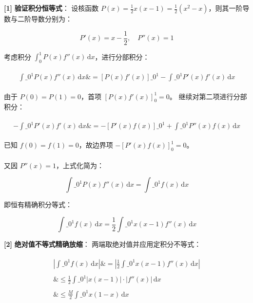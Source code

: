 \documentclass[11pt,a4paper,UTF8]{ctexart}
\begin{document}
\begin{solbox}[分步推导与答题规范]
\textbf{[1]}  \textbf{验证积分恒等式}：
设核函数 $P(x) = \frac{1}{2}x(x-1) = \frac{1}{2}(x^2 - x)$，则其一阶导数与二阶导数分别为：

\begin{equation*}
P'(x) = x - \frac{1}{2},\quad P''(x) = 1
\end{equation*}

考虑积分 $\int_0^1 P(x)f''(x)\,\mathrm{d}x$，进行分部积分：

\begin{align*}
\begin{aligned}
\int\_0^1 P(x)f''(x)\,\mathrm{d}x \&= \left[ P(x)f'(x) \right]\_0^1 - \int\_0^1 P'(x)f'(x)\,\mathrm{d}x
\end{aligned}
\end{align*}

由于 $P(0) = P(1) = 0$，首项 $\left[ P(x)f'(x) \right]_0^1 = 0$。
继续对第二项进行分部积分：

\begin{align*}
\begin{aligned}
-\int\_0^1 P'(x)f'(x)\,\mathrm{d}x \&= -\left[ P'(x)f(x) \right]\_0^1 + \int\_0^1 P''(x)f(x)\,\mathrm{d}x
\end{aligned}
\end{align*}

已知 $f(0) = f(1) = 0$，故边界项 $-\left[ P'(x)f(x) \right]_0^1 = 0$。\\ \\
又因 $P''(x) = 1$，上式化简为：

\begin{equation*}
\int\_0^1 P(x)f''(x)\,\mathrm{d}x = \int\_0^1 f(x)\,\mathrm{d}x
\end{equation*}

即恒有精确积分等式：

\begin{equation*}
\int\_0^1 f(x)\,\mathrm{d}x = \frac{1}{2}\int\_0^1 x(x-1)f''(x)\,\mathrm{d}x
\end{equation*}


\textbf{[2]}  \textbf{绝对值不等式精确放缩}：
两端取绝对值并应用定积分不等式：

\begin{align*}
\begin{aligned}
\left| \int\_0^1 f(x)\,\mathrm{d}x \right| \&= \left| \frac{1}{2}\int\_0^1 x(x-1)f''(x)\,\mathrm{d}x \right| \\ \\
\&\le \frac{1}{2}\int\_0^1 |x(x-1)| \cdot |f''(x)|\,\mathrm{d}x \\ \\
\&\le \frac{M}{2} \int\_0^1 x(1-x)\,\mathrm{d}x
\end{aligned}
\end{align*}



\end{solbox}
\end{document}
